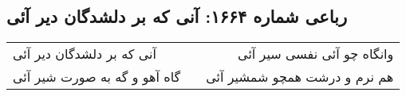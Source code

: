 \begin{center}
\section*{رباعی شماره ۱۶۶۴: آنی که بر دلشدگان دیر آئی}
\label{sec:1664}
\begin{longtable}{l p{0.5cm} r}
آنی که بر دلشدگان دیر آئی
&&
وانگاه چو آئی نفسی سیر آئی
\\
گاه آهو و گه به صورت شیر آئی
&&
هم نرم و درشت همچو شمشیر آئی
\\
\end{longtable}
\end{center}
